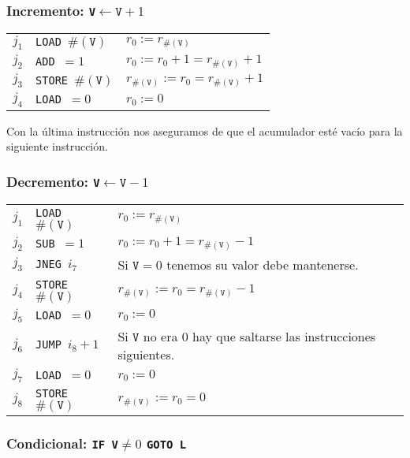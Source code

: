 \documentclass[twoside]{article}
\begin{document}
\subsubsection{Incremento: \texttt{V}$\leftarrow\texttt{V}+1$}

\begin{tabular}{l l l}
$j_1$ & \texttt{LOAD }$\#(\texttt{V})$ & $r_0:=r_{\#(\texttt{V})}$\\
$j_2$ & \texttt{ADD }$=1$              & $r_0:=r_0+1=r_{\#(\texttt{V})}+1$\\
$j_3$ & \texttt{STORE }$\#(\texttt{V})$ & $r_{\#(\texttt{V})}:=r_0=r_{\#(\texttt{V})}+1$\\
$j_4$ & \texttt{LOAD }$=0$               & $r_0:=0$
\end{tabular}

\vspace{0.5cm}

Con la última instrucción nos aseguramos de que el acumulador esté vacío para la siguiente instrucción.


\subsubsection{Decremento: \texttt{V}$\leftarrow\texttt{V}-1$}
 

\begin{tabular}{l l l}
$j_1$ & \texttt{LOAD }$\#(\texttt{V})$ & $r_0:=r_{\#(\texttt{V})}$\\
$j_2$ & \texttt{SUB }$=1$              & $r_0:=r_0+1=r_{\#(\texttt{V})}-1$\\
$j_3$ & \texttt{JNEG }$i_7$ & Si $\texttt{V}=0$ tenemos su valor debe mantenerse.\\
$j_4$ & \texttt{STORE }$\#(\texttt{V})$ & $r_{\#(\texttt{V})}:=r_0=r_{\#(\texttt{V})}-1$\\
$j_5$ & \texttt{LOAD }$=0$               & $r_0:=0$\\
$j_6$ & \texttt{JUMP }$i_8+1$ & Si $\texttt{V}$ no era 0 hay que saltarse las instrucciones siguientes.\\
$j_7$ & \texttt{LOAD }$=0$ & $r_0:=0$\\
$j_8$ & \texttt{STORE }$\#(\texttt{V})$ & $r_{\#(\texttt{V})}:=r_0=0$
\end{tabular}


\subsubsection{Condicional: \texttt{IF V}$\neq 0$ \texttt{GOTO L}}
\end{document}
